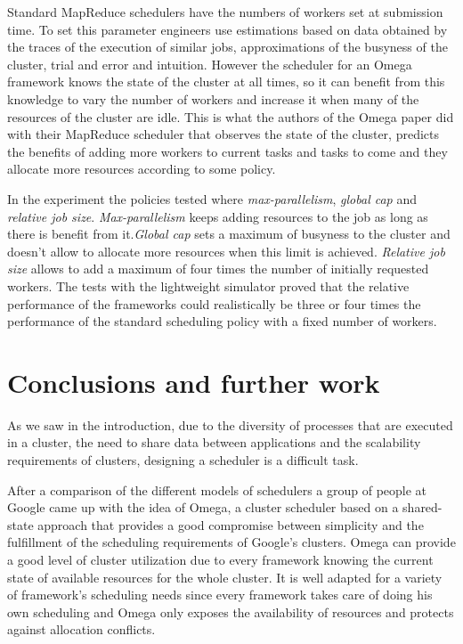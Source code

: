 \documentclass{article}                     %
\begin{document}
Standard MapReduce schedulers have the numbers of workers set at
submission time. To set this parameter engineers use estimations based
on data obtained by the traces of the execution of similar jobs,
approximations of the busyness of the cluster, trial and error and
intuition. However the scheduler for an Omega framework knows the
state of the cluster at all times, so it can benefit from this
knowledge to vary the number of workers and increase it when many of
the resources of the cluster are idle. This is what the authors of the
Omega paper did with their MapReduce scheduler that observes the state
of the cluster, predicts the benefits of adding more workers to
current tasks and tasks to come and they allocate more resources
according to some policy.

In the experiment the policies tested where \emph{max-parallelism},
\emph{global cap} and \emph{relative job size}. \emph{Max-parallelism}
keeps adding resources to the job as long as there is benefit from
it.\emph{Global cap} sets a maximum of busyness to the cluster and
doesn't allow to allocate more resources when this limit is
achieved. \emph{Relative job size} allows to add a maximum of four
times the number of initially requested workers. The tests with the
lightweight simulator proved that the relative performance of the
frameworks could realistically be three or four times the performance
of the standard scheduling policy with a fixed number of workers.


\section{Conclusions and further work}

As we saw in the introduction, due to the diversity of processes that
are executed in a cluster, the need to share data between applications
and the scalability requirements of clusters, designing a scheduler is
a difficult task.

After a comparison of the different models of schedulers a group of
people at Google came up with the idea of Omega, a cluster scheduler
based on a shared-state approach that provides a good compromise
between simplicity and the fulfillment of the scheduling requirements
of Google's clusters. Omega can provide a good level of cluster
utilization due to every framework knowing the current state of
available resources for the whole cluster. It is well adapted for a
variety of framework's scheduling needs since every framework takes
care of doing his own scheduling and Omega only exposes the
availability of resources and protects against allocation
conflicts.
\end{document}
